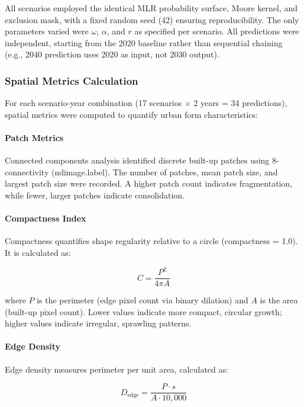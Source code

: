 \documentclass[12pt,a4paper]{article}
\begin{document}
All scenarios employed the identical MLR probability surface, Moore kernel, and exclusion mask, with a fixed random seed (42) ensuring reproducibility. The only parameters varied were $\omega$, $\alpha$, and $r$ as specified per scenario. All predictions were independent, starting from the 2020 baseline rather than sequential chaining (e.g., 2040 prediction uses 2020 as input, not 2030 output).

\subsubsection{Spatial Metrics Calculation}

For each scenario-year combination (17 scenarios $\times$ 2 years = 34 predictions), spatial metrics were computed to quantify urban form characteristics:

\paragraph{Patch Metrics}
Connected components analysis identified discrete built-up patches using 8-connectivity (ndimage.label). The number of patches, mean patch size, and largest patch size were recorded. A higher patch count indicates fragmentation, while fewer, larger patches indicate consolidation.

\paragraph{Compactness Index}
Compactness quantifies shape regularity relative to a circle (compactness = 1.0). It is calculated as:

\begin{equation}
C = \frac{P^2}{4\pi A}
\label{eq:compactness}
\end{equation}

where $P$ is the perimeter (edge pixel count via binary dilation) and $A$ is the area (built-up pixel count). Lower values indicate more compact, circular growth; higher values indicate irregular, sprawling patterns.

\paragraph{Edge Density}
Edge density measures perimeter per unit area, calculated as:

\begin{equation}
D_{\text{edge}} = \frac{P \cdot s}{A \cdot 10{,}000}
\label{eq:edge_density}
\end{equation}
\end{document}
